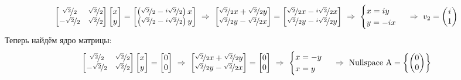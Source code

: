 \documentclass[a3paper,14pt]{extarticle}
\begin{document}
$$\begin{bmatrix}
    \nicefrac{\sqrt{2}}{2} & \nicefrac{\sqrt{2}}{2} \\ -\nicefrac{\sqrt{2}}{2} & \nicefrac{\sqrt{2}}{2}
\end{bmatrix}\begin{bmatrix}
    x \\ y
\end{bmatrix} = \begin{bmatrix}
    \left(\nicefrac{\sqrt{2}}{2} - \nicefrac{i\sqrt{2}}{2}\right)x \\ \left(\nicefrac{\sqrt{2}}{2} - \nicefrac{i\sqrt{2}}{2}\right)y
\end{bmatrix} \ \Rightarrow\ \begin{bmatrix}
    \nicefrac{\sqrt{2}}{2}x + \nicefrac{\sqrt{2}}{2}y \\ \nicefrac{\sqrt{2}}{2}y -\nicefrac{\sqrt{2}}{2}x
\end{bmatrix} = \begin{bmatrix}
    \nicefrac{\sqrt{2}}{2}x - \nicefrac{i\sqrt{2}}{2}x \\ \nicefrac{\sqrt{2}}{2}y - \nicefrac{i\sqrt{2}}{2}y
\end{bmatrix} \ \Rightarrow\ \begin{cases}
    x = iy \\
    y = -ix
\end{cases} \ \Rightarrow\ v_2=\begin{pmatrix}
    i \\ 1
\end{pmatrix}$$
Теперь найдём ядро матрицы:
$$\begin{bmatrix}
    \nicefrac{\sqrt{2}}{2} & \nicefrac{\sqrt{2}}{2} \\ -\nicefrac{\sqrt{2}}{2} & \nicefrac{\sqrt{2}}{2}
\end{bmatrix}\begin{bmatrix}
    x \\ y
\end{bmatrix} = \begin{bmatrix}
    0 \\ 0
\end{bmatrix} \ \Rightarrow\ \begin{bmatrix}
    \nicefrac{\sqrt{2}}{2}x + \nicefrac{\sqrt{2}}{2}y \\ \nicefrac{\sqrt{2}}{2}y -\nicefrac{\sqrt{2}}{2}x
\end{bmatrix} = \begin{bmatrix}
    0 \\ 0
\end{bmatrix} \ \Rightarrow\ \begin{cases}
    x = -y \\
    x = y
\end{cases} \ \Rightarrow\ \text{Nullspace A} = \left\{\begin{pmatrix}
    0 \\ 0
\end{pmatrix}\right\}$$
\end{document}

